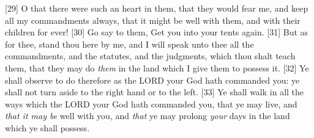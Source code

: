 [29] \textcolor[rgb]{0.00,0.00,1.00}{O that there were such an heart in them, that they would fear me, and keep all my commandments always, that it might be well with them, and with their children for ever!}
[30] \textcolor[rgb]{0.00,0.00,1.00}{Go say to them, Get you into your tents again.}
[31] \textcolor[rgb]{0.00,0.00,1.00}{But as for thee, stand thou here by me, and I will speak unto thee all the commandments, and the statutes, and the judgments, which thou shalt teach them, that they may do \emph{them} in the land which I give them to possess it.}
[32] \textcolor[rgb]{0.00,0.00,1.00}{Ye shall observe to do therefore as the LORD your God hath commanded you: ye shall not turn aside to the right hand or to the left.}
[33] \textcolor[rgb]{0.00,0.00,1.00}{Ye shall walk in all the ways which the LORD your God hath commanded you, that ye may live, and \emph{that it may be} well with you, and \emph{that} ye may prolong \emph{your} days in the land which ye shall possess.}
\newpage
